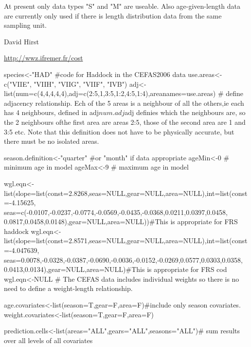 \begin{Note}\relax
At present only data types "S" and "M" are useable. Also age-given-length data are currently only 
used if there is length distribution data from the same sampling unit.
\end{Note}
\begin{Author}\relax
David Hirst
\end{Author}
\begin{References}\relax
\url{http://wwz.ifremer.fr/cost}
\end{References}
\begin{SeeAlso}\relax
{}
\end{SeeAlso}
\begin{Examples}
\begin{ExampleCode}
species<-"HAD" #code for Haddock in the CEFAS2006 data
use.areas<-c("VIIE", "VIIH", "VIIG", "VIIF", "IVB")
adj<-list(num=c(4,4,4,4,4),adj=c(2:5,1,3:5,1:2,4:5,1:4),areanames=use.areas)
# define adjacency relationship. Ech of the 5 areas is a neighbour of all the others,ie each has 
4 neighbours, defined in adj$num. adj$adj definies which the neighbours are, so the 2 neighbours 
ofthe first area are areas 2:5, those of the second area are 1 and 3:5 etc. Note that this 
definition does not have to be physically accurate, but there must be no isolated areas.

season.definition<-"quarter" #or "month" if data appropriate
ageMin<-0 # minimum age in model
ageMax<-9 # maximum age in model

wgl.eqn<-list(slope=list(const=2.8268,seas=NULL,gear=NULL,area=NULL),int=list(const=-4.15625,
   seas=c(-0.0107,-0.0237,-0.0774,-0.0569,-0.0435,-0.0368,0.0211,0.0397,0.0458,
     0.0817,0.0458,0.0148),gear=NULL,area=NULL))#This is appropriate for FRS haddock
wgl.eqn<-list(slope=list(const=2.8571,seas=NULL,gear=NULL,area=NULL),int=list(const=-4.047639,
   seas=0.0078,-0.0328,-0.0387,-0.0690,-0.0036,-0.0152,-0.0269,0.0577,0.0303,0.0358,
     0.0413,0.0134),gear=NULL,area=NULL)#This is appropriate for FRS cod
wgl.eqn<-NULL # The CEFAS data includes individual weights so there is no need to define a 
weight-length relationship.

age.covariates<-list(season=T,gear=F,area=F)#include only season covariates.
weight.covariates<-list(season=T,gear=F,area=F)

prediction.cells<-list(areas="ALL",gears="ALL",seasons="ALL")# sum results over all levels of all 
covariates


\end{ExampleCode}
\end{Examples}
